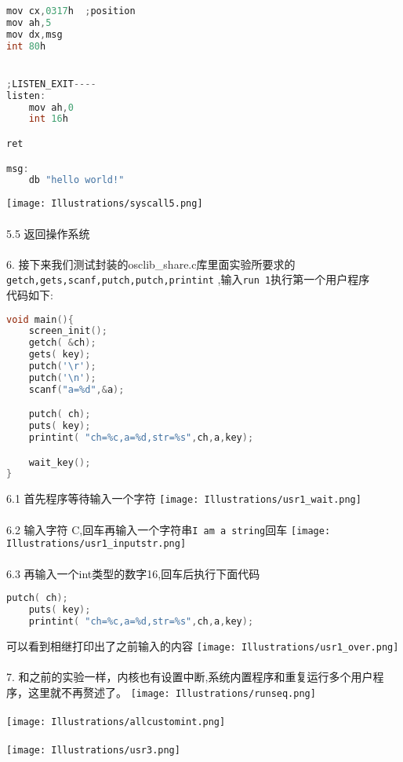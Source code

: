 \documentclass[a4paper]{article}
\begin{document}
{{{\begin{lstlisting}[language={C}]
mov cx,0317h  ;position
mov ah,5
mov dx,msg
int 80h


;LISTEN_EXIT----
listen:
	mov ah,0
	int 16h

ret

msg:
	db "hello world!"
	\end{lstlisting}}

{\center\texttt{[image: Illustrations/syscall5.png]}}\\\\
5.5 返回操作系统\\\\
6. 接下来我们测试封装的osclib\_share.c库里面实验所要求的\\
\verb|getch,gets,scanf,putch,putch,printint| ,输入\verb|run 1|执行第一个用户程序\\
代码如下:\\
{\scriptsize\begin{lstlisting}[language={C}]
void main(){
	screen_init();
	getch( &ch);
	gets( key);
	putch('\r');
	putch('\n');
	scanf("a=%d",&a);

	putch( ch);
	puts( key);
	printint( "ch=%c,a=%d,str=%s",ch,a,key);

	wait_key();
}

\end{lstlisting}}
6.1 首先程序等待输入一个字符
{\center\texttt{[image: Illustrations/usr1\_wait.png]}}\\\\
6.2 输入字符 C,回车再输入一个字符串\verb|I am a string|回车
{\center\texttt{[image: Illustrations/usr1\_inputstr.png]}}\\\\
6.3 再输入一个int类型的数字16,回车后执行下面代码\\
{\scriptsize\begin{lstlisting}[language={C}]
	putch( ch);
	puts( key);
	printint( "ch=%c,a=%d,str=%s",ch,a,key);
\end{lstlisting}}
可以看到相继打印出了之前输入的内容
{\center\texttt{[image: Illustrations/usr1\_over.png]}}\\\\

7. 和之前的实验一样，内核也有设置中断,系统内置程序和重复运行多个用户程序，这里就不再赘述了。
{\center\texttt{[image: Illustrations/runseq.png]}}\\\\
{\center\texttt{[image: Illustrations/allcustomint.png]}}\\\\
{\center\texttt{[image: Illustrations/usr3.png]}}\\\\

}}
\end{document}

